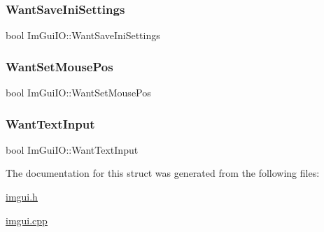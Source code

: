 \subsubsection{\texorpdfstring{Want\+Save\+Ini\+Settings}{WantSaveIniSettings}}
{\footnotesize\ttfamily bool Im\+Gui\+I\+O\+::\+Want\+Save\+Ini\+Settings}

\mbox{\label{struct_im_gui_i_o_a877f6adba2c961f361df7697f908649a}} 
\subsubsection{\texorpdfstring{Want\+Set\+Mouse\+Pos}{WantSetMousePos}}
{\footnotesize\ttfamily bool Im\+Gui\+I\+O\+::\+Want\+Set\+Mouse\+Pos}

\mbox{\label{struct_im_gui_i_o_a0e53197e96187a57b2d86720bf163f4d}} 
\subsubsection{\texorpdfstring{Want\+Text\+Input}{WantTextInput}}
{\footnotesize\ttfamily bool Im\+Gui\+I\+O\+::\+Want\+Text\+Input}



The documentation for this struct was generated from the following files\+:\begin{DoxyCompactItemize}
\item 
\mbox{\hyperlink{imgui_8h}{imgui.\+h}}\item 
\mbox{\hyperlink{imgui_8cpp}{imgui.\+cpp}}\end{DoxyCompactItemize}
